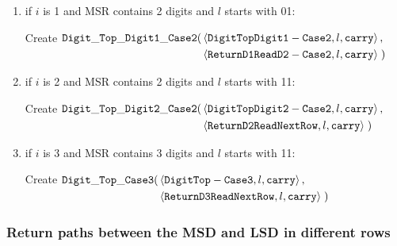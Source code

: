 \begin{itemize}
\begin{enumerate}[label=\alph*)]
                \item if $i$ is 1 and MSR contains 2 digits and $l$ starts with 01:

                Create
                $\begin{aligned}[t]
                    {\tt Digit\_Top\_Digit1\_Case2}(& \left \langle {\tt DigitTopDigit1-Case2}, l, {\tt carry} \right\rangle, & \\
                                     & \left \langle {\tt ReturnD1ReadD2-Case2}, l, {\tt carry} \right\rangle \;)
                \end{aligned}$
                \vspace{.5cm}


                \item if $i$ is 2 and MSR contains 2 digits and $l$ starts with 11:

                Create
                $\begin{aligned}[t]
                    {\tt Digit\_Top\_Digit2\_Case2}(& \left \langle {\tt DigitTopDigit2-Case2}, l, {\tt carry} \right\rangle, & \\
                                     & \left \langle {\tt ReturnD2ReadNextRow},  l,   {\tt carry} \right\rangle \;)
                \end{aligned}$
                \vspace{.5cm}


                \item if $i$ is 3 and MSR contains 3 digits and $l$ starts with 11:

                Create
                $\begin{aligned}[t]
                    {\tt Digit\_Top\_Case3}(& \left \langle {\tt DigitTop-Case3}, l, {\tt carry} \right\rangle, & \\
                                   & \left \langle {\tt ReturnD3ReadNextRow},  l, {\tt carry} \right\rangle \;)
                \end{aligned}$
                \vspace{.5cm}


            \end{enumerate}

        \end{itemize}
    \vspace{1cm}



    \subsubsection{Return paths between the MSD and LSD in different rows}

